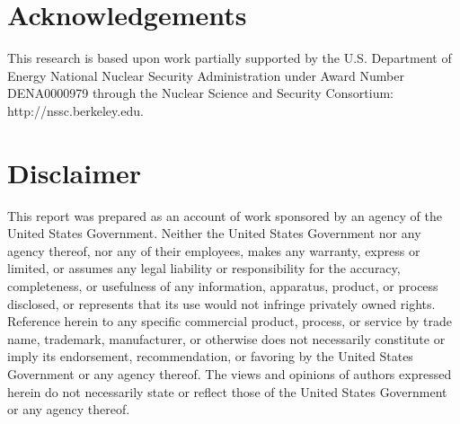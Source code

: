 \documentclass[preprint,12pt]{elsarticle}
\begin{document}


\section*{Acknowledgements}
\label{sec:ack}

This research is based upon work partially supported by the U.S. Department of Energy National Nuclear Security Administration under Award Number DENA0000979 through the Nuclear Science and Security Consortium: http://nssc.berkeley.edu.

\section*{Disclaimer}
\label{sec:disc}

This report was prepared as an account of work sponsored by an agency of the United States Government. Neither the United States Government nor any agency thereof, nor any of their employees, makes any warranty, express or limited, or assumes any legal liability or responsibility for the accuracy, completeness, or usefulness of any information, apparatus, product, or process disclosed, or represents that its use would not infringe privately owned rights. Reference herein to any specific commercial product, process, or service by trade name, trademark, manufacturer, or otherwise does not necessarily constitute or imply its endorsement, recommendation, or favoring by the United States Government or any agency thereof. The views and opinions of authors expressed herein do not necessarily state or reflect those of the United States Government or any agency thereof.



\end{document}

